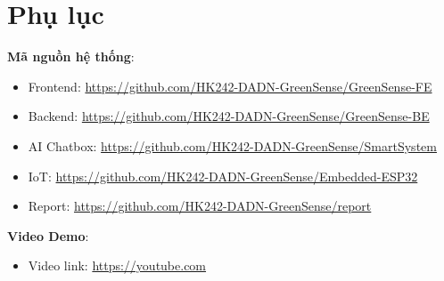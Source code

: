 \section{Phụ lục}

\textbf{Mã nguồn hệ thống}:
\begin{itemize}
    \item Frontend: \href{https://github.com/HK242-DADN-GreenSense/GreenSense-FE}{https://github.com/HK242-DADN-GreenSense/GreenSense-FE}
    \item Backend: \href{https://github.com/HK242-DADN-GreenSense/GreenSense-BE}{https://github.com/HK242-DADN-GreenSense/GreenSense-BE}
    \item AI Chatbox: \href{https://github.com/HK242-DADN-GreenSense/SmartSystem}{https://github.com/HK242-DADN-GreenSense/SmartSystem}
    \item IoT: \href{https://github.com/HK242-DADN-GreenSense/Embedded-ESP32}{https://github.com/HK242-DADN-GreenSense/Embedded-ESP32}
    \item Report: \href{https://github.com/HK242-DADN-GreenSense/report}{https://github.com/HK242-DADN-GreenSense/report}
\end{itemize}

\textbf{Video Demo}:
\begin{itemize}
    \item Video link:  \href{https://youtube.com}{https://youtube.com}
\end{itemize}